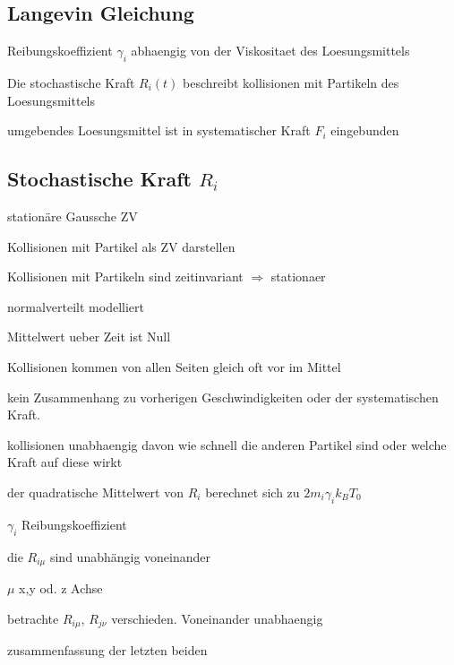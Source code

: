 \documentclass[twocolumn]{article}
\let\tempone\itemize
\let\temptwo\enditemize
\renewenvironment{itemize}{\tempone\addtolength{\itemsep}{-.5\baselineskip}}{\temptwo}
\begin{document}
\subsection{Langevin Gleichung}
\begin{itemize}
  	\item Reibungskoeffizient $\gamma_i$ abhaengig von der Viskositaet des Loesungsmittels
  	\item Die stochastische Kraft $R_i(t)$ beschreibt kollisionen mit Partikeln des Loesungsmittels
  	\item umgebendes Loesungsmittel ist in systematischer Kraft $F_i$ eingebunden
\end{itemize}

\subsection{Stochastische Kraft $R_i$}
\begin{itemize}
	\item stationäre Gaussche ZV
	\begin{itemize}
		\item Kollisionen mit Partikel als ZV darstellen
		\item Kollisionen mit Partikeln sind zeitinvariant $\Rightarrow$ stationaer
		\item normalverteilt modelliert 
	\end{itemize}
	\item Mittelwert ueber Zeit ist Null
	\begin{itemize}
		\item Kollisionen kommen von allen Seiten gleich oft vor im Mittel
	\end{itemize}
	\item kein Zusammenhang zu vorherigen Geschwindigkeiten oder der systematischen Kraft.
	\begin{itemize}
		\item kollisionen unabhaengig davon wie schnell die anderen Partikel sind oder welche Kraft auf diese wirkt
	\end{itemize}	 
	\item der quadratische Mittelwert von $R_i$ berechnet sich zu $2 m_i \gamma_i k_B T_0$ %
	\begin{itemize}
		\item $\gamma_i$ Reibungskoeffizient
	\end{itemize}
	\item die $R_{i \mu}$ sind unabhängig voneinander
	\begin{itemize}
		\item $\mu$ x,y od. z Achse
		\item betrachte $R_{i \mu}$, $R_{j \nu}$ verschieden. Voneinander unabhaengig 
	\end{itemize}
	\item zusammenfassung der letzten beiden%
\end{itemize}
\end{document}
